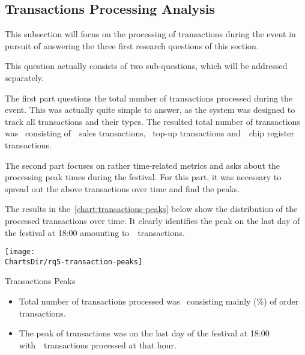 
\subsection{Transactions Processing Analysis}
\label{subsec:analysis-performance-indicators-transactions}

This subsection will focus on the processing of transactions during the event in pursuit of answering the three first research questions of this section.


This question actually consists of two sub-questions, which will be addressed separately.

The first part questions the total number of transactions processed during the event.
This was actually quite simple to answer, as the system was designed to track all transactions and their types.
The resulted total number of transactions was~ consisting of~~sales transactions, ~top-up transactions and~~chip register transactions.

The second part focuses on rather time-related metrics and asks about the processing peak times during the festival.
For this part, it was necessary to spread out the above transactions over time and find the peaks.

The results in the~\autoref{chart:transactions-peaks} below show the distribution of the processed transactions over time.
It clearly identifies the peak on the last day of the festival at 18:00 amounting to~~transactions.

\begin{chart}[H]
	\centering
	\texttt{[image: \\ChartsDir/rq5-transaction-peaks]}
	\caption{ Transactions Peaks}
	\label{chart:transactions-peaks}
	\source
\end{chart}

\begin{keytakeaways}
	\begin{itemize}
		\item Total number of transactions processed was~ consisting mainly (\%) of order transactions.
		\item The peak of transactions was on the last day of the festival at 18:00 with~~transactions processed at that hour.
	\end{itemize}
\end{keytakeaways}

